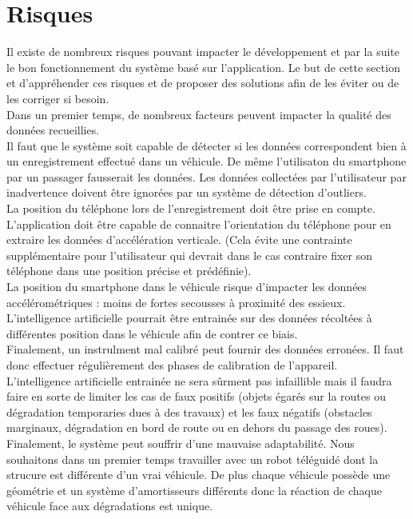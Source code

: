 \section{Risques}
Il existe de nombreux risques pouvant impacter le développement et par la suite le bon fonctionnement du système basé sur l'application. Le but de cette section et d'appréhender ces risques et de proposer des solutions afin de les éviter ou de les corriger si besoin.\\

Dans un premier temps, de nombreux facteurs peuvent impacter la qualité des données recueillies.\\
Il faut que le système soit capable de détecter si les données correspondent bien à un enregistrement effectué dans un véhicule. De même l'utilisaton du smartphone par un passager fausserait les données. Les données collectées par l'utilisateur par inadvertence doivent être ignorées par un système de détection d'outliers.\\
La position du téléphone lors de l'enregistrement doit être prise en compte. L'application doit être capable de connaitre l'orientation du téléphone pour en extraire les données d'accélération verticale. (Cela évite une contrainte supplémentaire pour l'utilisateur qui devrait dans le cas contraire fixer son téléphone dans une position précise et prédéfinie).\\
La position du smartphone dans le véhicule risque d'impacter les données accélérométriques : moins de fortes secousses à proximité des essieux. L'intelligence artificielle pourrait être entrainée sur des données récoltées à différentes position dans le véhicule afin de contrer ce biais.\\
Finalement, un instrulment mal calibré peut fournir des données erronées. Il faut donc effectuer régulièrement des phases de calibration de l'appareil.\\

L'intelligence artificielle entrainée ne sera sûrment pas infaillible mais il faudra faire en sorte de limiter les cas de faux positifs (objets égarés sur la routes ou dégradation temporaries dues à des travaux) et les faux négatifs (obstacles marginaux, dégradation en bord de route ou en dehors du passage des roues).\\

Finalement, le système peut souffrir d'une mauvaise adaptabilité. Nous souhaitons dans un premier temps travailler avec un robot téléguidé dont la strucure est différente d'un vrai véhicule. De plus chaque véhicule possède une géométrie et un système d'amortisseurs différents donc la réaction de chaque véhicule face aux dégradations est unique.\\
